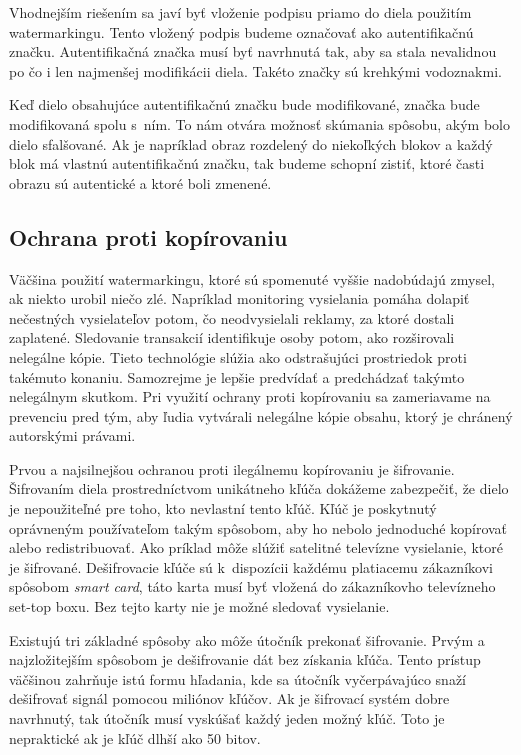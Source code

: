 Vhodnejším riešením sa javí byť vloženie podpisu priamo do diela použitím watermarkingu. Tento vložený podpis budeme označovať ako autentifikačnú značku. Autentifikačná značka musí byť navrhnutá tak, aby sa stala nevalidnou po čo i len najmenšej modifikácii diela. Takéto značky sú krehkými vodoznakmi.

Keď dielo obsahujúce autentifikačnú značku bude modifikované, značka bude modifikovaná spolu s~ním. To nám otvára možnosť skúmania spôsobu, akým bolo dielo sfalšované. Ak je napríklad obraz rozdelený do niekoľkých blokov a každý blok má vlastnú autentifikačnú značku, tak budeme schopní zistiť, ktoré časti obrazu sú autentické a ktoré boli zmenené. \cite{Cox}

\subsection{Ochrana proti kopírovaniu}
Väčšina použití watermarkingu, ktoré sú spomenuté vyššie nadobúdajú zmysel, ak niekto urobil niečo zlé. Napríklad monitoring vysielania pomáha dolapiť nečestných vysielateľov potom, čo neodvysielali reklamy, za ktoré dostali zaplatené. Sledovanie transakcií identifikuje osoby potom, ako rozširovali nelegálne kópie. Tieto technológie slúžia ako odstrašujúci prostriedok proti takémuto konaniu. Samozrejme je lepšie predvídať a predchádzať takýmto nelegálnym skutkom. Pri využití ochrany proti kopírovaniu sa zameriavame na prevenciu pred tým, aby ľudia vytvárali nelegálne kópie obsahu, ktorý je chránený autorskými právami.

Prvou a najsilnejšou ochranou proti ilegálnemu kopírovaniu je šifrovanie. Šifrovaním diela prostredníctvom unikátneho kľúča dokážeme zabezpečiť, že dielo je nepoužiteľné pre toho, kto nevlastní tento kľúč. Kľúč je poskytnutý oprávneným používateľom takým spôsobom, aby ho nebolo jednoduché kopírovať alebo redistribuovať. Ako príklad môže slúžiť satelitné televízne vysielanie, ktoré je šifrované. Dešifrovacie kľúče sú k~dispozícii každému platiacemu zákazníkovi spôsobom {\it smart card}, táto karta musí byť vložená do zákazníkovho televízneho set-top boxu. Bez tejto karty nie je možné sledovať vysielanie.

Existujú tri základné spôsoby ako môže útočník prekonať šifrovanie. Prvým a najzložitejším spôsobom je dešifrovanie dát bez získania kľúča. Tento prístup väčšinou zahrňuje istú formu hľadania, kde sa útočník vyčerpávajúco snaží dešifrovať signál pomocou miliónov kľúčov. Ak je šifrovací systém dobre navrhnutý, tak útočník musí vyskúšať každý jeden možný kľúč. Toto je nepraktické ak je kľúč dlhší ako 50 bitov.

